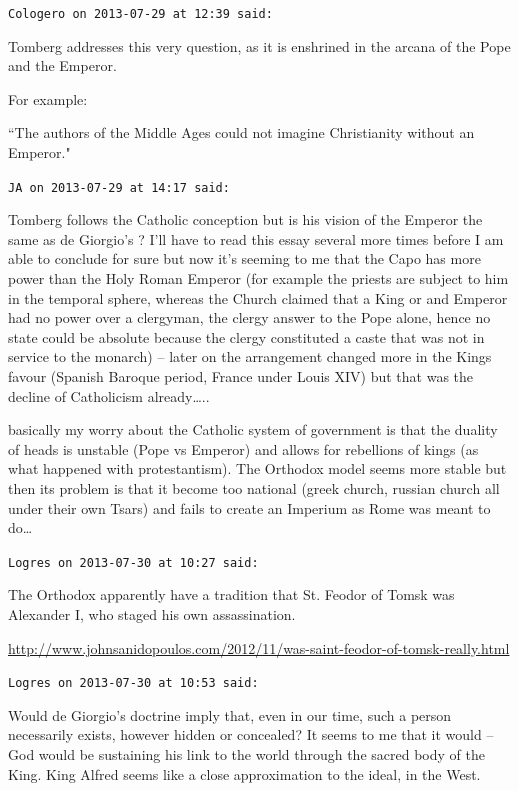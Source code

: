 \begin{footnotesize}
\begin{sffamily}
\hfill

\texttt{Cologero on 2013-07-29 at 12:39 said: }

Tomberg addresses this very question, as it is enshrined in the arcana of the Pope and the Emperor.

For example:

``The authors of the Middle Ages could not imagine Christianity without an Emperor."


\hfill

\texttt{JA on 2013-07-29 at 14:17 said: }

Tomberg follows the Catholic conception but is his vision of the Emperor the same as de Giorgio's ? I'll have to read this essay several more times before I am able to conclude for sure but now it's seeming to me that the Capo has more power than the Holy Roman Emperor (for example the priests are subject to him in the temporal sphere, whereas the Church claimed that a King or and Emperor had no power over a clergyman, the clergy answer to the Pope alone, hence no state could be absolute because the clergy constituted a caste that was not in service to the monarch) – later on the arrangement changed more in the Kings favour (Spanish Baroque period, France under Louis XIV) but that was the decline of Catholicism already…..

basically my worry about the Catholic system of government is that the duality of heads is unstable (Pope vs Emperor) and allows for rebellions of kings (as what happened with protestantism). The Orthodox model seems more stable but then its problem is that it become too national (greek church, russian church all under their own Tsars) and fails to create an Imperium as Rome was meant to do…


\hfill

\texttt{Logres on 2013-07-30 at 10:27 said: }

The Orthodox apparently have a tradition that St. Feodor of Tomsk was Alexander I, who staged his own assassination.

\url{http://www.johnsanidopoulos.com/2012/11/was-saint-feodor-of-tomsk-really.html}


\hfill

\texttt{Logres on 2013-07-30 at 10:53 said: }

Would de Giorgio's doctrine imply that, even in our time, such a person necessarily exists, however hidden or concealed? It seems to me that it would – God would be sustaining his link to the world through the sacred body of the King. King Alfred seems like a close approximation to the ideal, in the West.



\end{sffamily}
\end{footnotesize}
